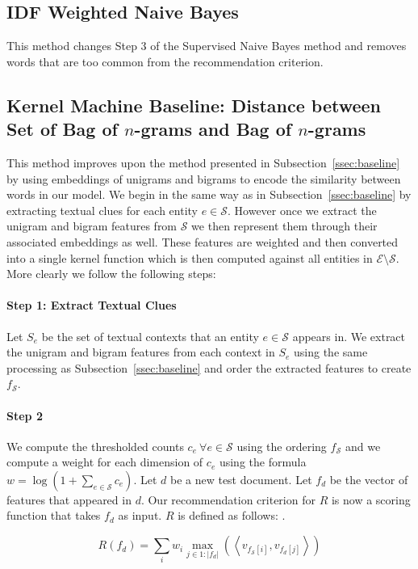 \documentclass{article}
\newcommand{\ssecref}[1]{Subsection~\ref{#1}}
\newcommand{\ems}{$\mathcal{E} \setminus \mathcal{S}$}
\newcommand{\vip}[2]{\left\langle v_{#1}, v_{#2} \right\rangle}
\newcommand{\Todo}[1]{\todo[author=Pushpendre,size=\small,inline]{#1}}
\begin{document}
\subsection{IDF Weighted Naive Bayes}
\label{ssec:idf-weighted-nb}
This method changes Step 3 of the Supervised Naive Bayes method and removes
words that are too common from the recommendation criterion.

\subsection{Kernel Machine Baseline: Distance between Set of Bag of $n$-grams
  and Bag of $n$-grams}
\label{sec:kernel-machine}
This method improves upon the method presented in \ssecref{ssec:baseline}
by using embeddings of unigrams and bigrams to encode the similarity between
words in our model. We begin in the same way as in \ssecref{ssec:baseline}
by extracting textual clues for each entity $e \in \mathcal{S}$. However once
we extract the unigram and bigram features from $\mathcal{S}$ we then represent
them through their associated embeddings as well. These features are weighted
and then converted into a single kernel function which is then computed against
all entities in \ems. More clearly we follow the following steps:
\paragraph{Step 1: Extract Textual Clues}
Let $S_e$ be the set of textual contexts that an entity $e \in \mathcal{S}$
appears in. We extract the unigram and bigram features from each context in
$S_e$ using the same processing as \ssecref{ssec:baseline} and order the
extracted features to create $f_{\mathcal{S}}$.
\paragraph{Step 2}
We compute the thresholded counts $c_e \ \forall e \in \mathcal{S}$ using the
ordering $f_{\mathcal{S}}$ and we
compute a weight for each dimension of $c_e$ using the formula
$w = \log \left(1 + {\sum_{e \in \mathcal{S}}c_e}\right)$.
Let $d$ be a new test document.
Let $f_d$ be the vector of features that appeared in $d$.
Our recommendation criterion for $R$ is now a scoring
function that takes $f_d$ as input.
$R$ is defined as follows:
\Todo{$R$ is mercer.}.

\begin{equation}
  \label{eq:baseline-wsim-rc}
  R(f_d) = \sum_i w_i \max_{j \in 1:|f_d|}(\vip{f_{\mathcal{S}}[i]}{f_d[j]})
\end{equation}
\end{document}
